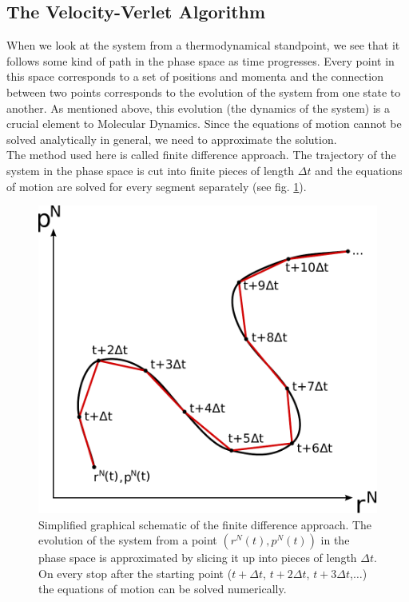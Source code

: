 \documentclass[12pt]{article}
\begin{document}
\subsection{The Velocity-Verlet Algorithm}
\label{section:verlet}
When we look at the system from a thermodynamical standpoint, we see that it follows some kind of path in the phase space as time progresses. Every
point in this space corresponds to a set of positions and momenta and the connection between two points corresponds to the evolution of the system
from one state to another. As mentioned above, this evolution (the dynamics of the system) is a crucial element to Molecular Dynamics. Since the
equations of motion cannot be solved analytically in general, we need to approximate the solution.\\
The method used here is called finite difference approach. The trajectory of the system in the phase space is cut into finite pieces of length $\Delta
t$ and the equations of motion are solved for every segment separately (see fig. \ref{fig:finitedifference}).\\
\begin{figure}
    \begin{center}
        \includegraphics[scale=0.5]{images/finite_approach.pdf}
        \caption{Simplified graphical schematic of the finite difference approach. The evolution of the system from a point $(r^N(t),p^N(t))$ in the
            phase space is approximated by slicing it up into pieces of length $\Delta t$. On every stop after the starting point ($t+\Delta t$, 
            $t+2\Delta t$, $t+3\Delta t$,$\ldots$) the equations of motion can be solved numerically.}
        \label{fig:finitedifference} 
    \end{center}
\end{figure}
\end{document}
